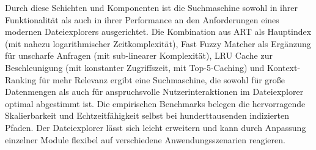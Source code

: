 Durch diese Schichten und Komponenten ist die Suchmaschine sowohl in ihrer Funktionalität als auch in ihrer Performance an den
Anforderungen eines modernen Dateiexplorers ausgerichtet. Die Kombination aus ART als Hauptindex (mit nahezu logarithmischer
Zeitkomplexität), Fast Fuzzy Matcher als Ergänzung für unscharfe Anfragen (mit sub-linearer Komplexität), LRU Cache zur
Beschleunigung (mit konstanter Zugriffszeit, mit Top-5-Caching) und Kontext-Ranking für mehr Relevanz ergibt eine Suchmaschine,
die sowohl für große Datenmengen als auch für anspruchsvolle Nutzerinteraktionen im Dateiexplorer optimal abgestimmt ist. Die
empirischen Benchmarks belegen die hervorragende Skalierbarkeit und Echtzeitfähigkeit selbst bei hunderttausenden indizierten
Pfaden. Der Dateiexplorer lässt sich leicht erweitern und kann durch Anpassung einzelner Module flexibel auf verschiedene
Anwendungsszenarien reagieren.

